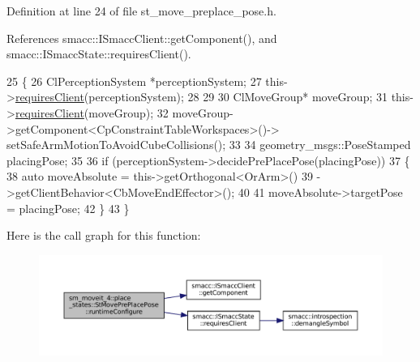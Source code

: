 Definition at line 24 of file st\+\_\+move\+\_\+preplace\+\_\+pose.\+h.



References smacc\+::\+I\+Smacc\+Client\+::get\+Component(), and smacc\+::\+I\+Smacc\+State\+::requires\+Client().


\begin{DoxyCode}
25             \{
26                 ClPerceptionSystem *perceptionSystem;
27                 this->\hyperlink{classsmacc_1_1ISmaccState_a7f95c9f0a6ea2d6f18d1aec0519de4ac}{requiresClient}(perceptionSystem);
28                 
29 
30                 ClMoveGroup* moveGroup;
31                 this->\hyperlink{classsmacc_1_1ISmaccState_a7f95c9f0a6ea2d6f18d1aec0519de4ac}{requiresClient}(moveGroup);
32                 moveGroup->getComponent<CpConstraintTableWorkspaces>()->
      setSafeArmMotionToAvoidCubeCollisions();
33 
34                 geometry\_msgs::PoseStamped placingPose;
35 
36                 \textcolor{keywordflow}{if} (perceptionSystem->decidePrePlacePose(placingPose))
37                 \{
38                     \textcolor{keyword}{auto} moveAbsolute = this->getOrthogonal<OrArm>()
39                                             ->getClientBehavior<CbMoveEndEffector>();
40 
41                     moveAbsolute->targetPose = placingPose;
42                 \}
43             \}
\end{DoxyCode}
Here is the call graph for this function\+:
\nopagebreak
\begin{figure}[H]
\begin{center}
\leavevmode
\includegraphics[width=350pt]{structsm__moveit__4_1_1place__states_1_1StMovePrePlacePose_a76aecb88d891dab05216eff868ee4ac7_cgraph}
\end{center}
\end{figure}
\mbox{\label{structsm__moveit__4_1_1place__states_1_1StMovePrePlacePose_afea638295fb6086b4d31c6b64302f2c2}} 
